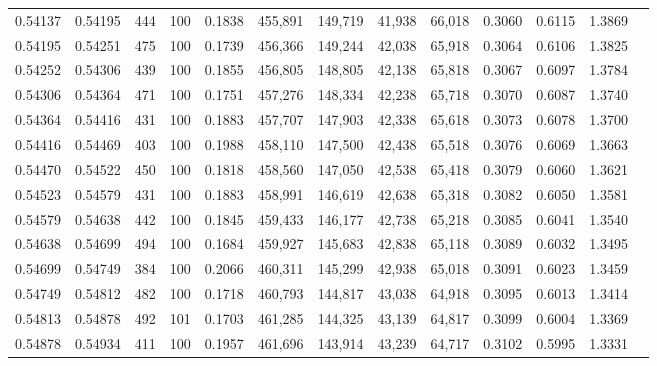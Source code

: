 \begin{tabular}{rrrrrrrrrrrrr}
0.54137 & 0.54195 &   444 & 100 &                                     0.1838 & 455,891 & 149,719 &  41,938 &  66,018 & 0.3060 & 0.6115 & 1.3869 \\
0.54195 & 0.54251 &   475 & 100 &                                     0.1739 & 456,366 & 149,244 &  42,038 &  65,918 & 0.3064 & 0.6106 & 1.3825 \\
0.54252 & 0.54306 &   439 & 100 &                                     0.1855 & 456,805 & 148,805 &  42,138 &  65,818 & 0.3067 & 0.6097 & 1.3784 \\
0.54306 & 0.54364 &   471 & 100 &                                     0.1751 & 457,276 & 148,334 &  42,238 &  65,718 & 0.3070 & 0.6087 & 1.3740 \\
0.54364 & 0.54416 &   431 & 100 &                                     0.1883 & 457,707 & 147,903 &  42,338 &  65,618 & 0.3073 & 0.6078 & 1.3700 \\
0.54416 & 0.54469 &   403 & 100 &                                     0.1988 & 458,110 & 147,500 &  42,438 &  65,518 & 0.3076 & 0.6069 & 1.3663 \\
0.54470 & 0.54522 &   450 & 100 &                                     0.1818 & 458,560 & 147,050 &  42,538 &  65,418 & 0.3079 & 0.6060 & 1.3621 \\
0.54523 & 0.54579 &   431 & 100 &                                     0.1883 & 458,991 & 146,619 &  42,638 &  65,318 & 0.3082 & 0.6050 & 1.3581 \\
0.54579 & 0.54638 &   442 & 100 &                                     0.1845 & 459,433 & 146,177 &  42,738 &  65,218 & 0.3085 & 0.6041 & 1.3540 \\
0.54638 & 0.54699 &   494 & 100 &                                     0.1684 & 459,927 & 145,683 &  42,838 &  65,118 & 0.3089 & 0.6032 & 1.3495 \\
0.54699 & 0.54749 &   384 & 100 &                                     0.2066 & 460,311 & 145,299 &  42,938 &  65,018 & 0.3091 & 0.6023 & 1.3459 \\
0.54749 & 0.54812 &   482 & 100 &                                     0.1718 & 460,793 & 144,817 &  43,038 &  64,918 & 0.3095 & 0.6013 & 1.3414 \\
0.54813 & 0.54878 &   492 & 101 &                                     0.1703 & 461,285 & 144,325 &  43,139 &  64,817 & 0.3099 & 0.6004 & 1.3369 \\
0.54878 & 0.54934 &   411 & 100 &                                     0.1957 & 461,696 & 143,914 &  43,239 &  64,717 & 0.3102 & 0.5995 & 1.3331 \\

\end{tabular}
